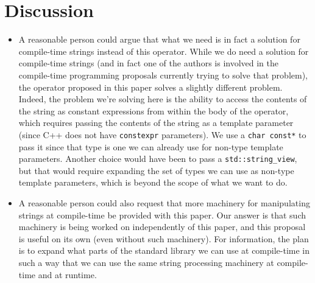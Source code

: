 \documentclass{wg21}
\newcommand{\cc}[1]{\texttt{#1}}
\begin{document}
\section{Discussion}
\begin{itemize}
  \item A reasonable person could argue that what we need is in fact a solution for
        compile-time strings instead of this operator. While we do need a solution
        for compile-time strings (and in fact one of the authors is involved in the
        compile-time programming proposals currently trying to solve that problem),
        the operator proposed in this paper solves a slightly different problem.
        Indeed, the problem we're solving here is the ability to access the contents
        of the string as constant expressions from within the body of the operator,
        which requires passing the contents of the string as a template parameter
        (since C++ does not have \cc{constexpr} parameters). We use a \cc{char const*}
        to pass it since that type is one we can already use for non-type template
        parameters. Another choice would have been to pass a \cc{std::string_view},
        but that would require expanding the set of types we can use as non-type
        template parameters, which is beyond the scope of what we want to do.

  \item A reasonable person could also request that more machinery for manipulating
        strings at compile-time be provided with this paper. Our answer is that such
        machinery is being worked on independently of this paper, and this proposal
        is useful on its own (even without such machinery). For information, the plan
        is to expand what parts of the standard library we can use at compile-time in
        such a way that we can use the same string processing machinery at compile-time
        and at runtime.
\end{itemize}
\end{document}
